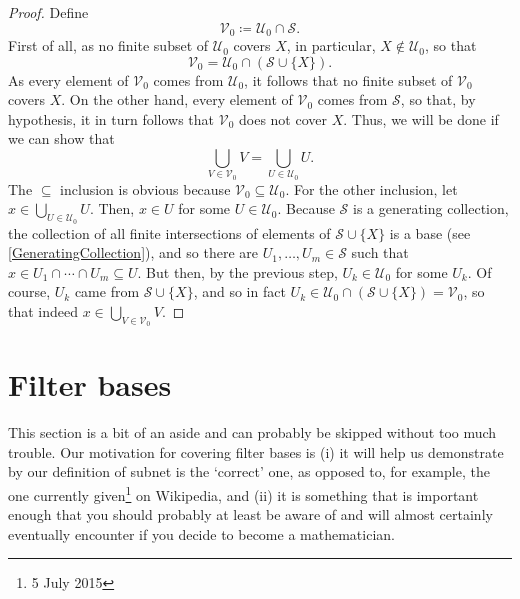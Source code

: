 \begin{thm}
\begin{proof}
Define
\begin{equation}
\mathcal{V}_0\coloneqq \mathcal{U}_0\cap \mathcal{S}.
\end{equation}
First of all, as no finite subset of $\mathcal{U}_0$ covers $X$, in particular, $X\notin \mathcal{U}_0$, so that
\begin{equation}
\mathcal{V}_0=\mathcal{U}_0\cap (\mathcal{S}\cup \{ X\} ).
\end{equation}
As every element of $\mathcal{V}_0$ comes from $\mathcal{U}_0$, it follows that no finite subset of $\mathcal{V}_0$ covers $X$.  On the other hand, every element of $\mathcal{V}_0$ comes from $\mathcal{S}$, so that, by hypothesis, it in turn follows that $\mathcal{V}_0$ does not cover $X$.  Thus, we will be done if we can show that
\begin{equation}
\bigcup _{V\in \mathcal{V}_0}V=\bigcup _{U\in \mathcal{U}_0}U.
\end{equation}
The $\subseteq$ inclusion is obvious because $\mathcal{V}_0\subseteq \mathcal{U}_0$.  For the other inclusion, let $x\in \bigcup _{U\in \mathcal{U}_0}U$.  Then, $x\in U$ for some $U\in \mathcal{U}_0$.  Because $\mathcal{S}$ is a generating collection, the collection of all finite intersections of elements of $\mathcal{S}\cup \{ X\}$ is a base (see \cref{GeneratingCollection}), and so there are $U_1,\ldots ,U_m\in \mathcal{S}$ such that $x\in U_1\cap \cdots \cap U_m\subseteq U$.  But then, by the previous step, $U_k\in \mathcal{U}_0$ for some $U_k$.  Of course, $U_k$ came from $\mathcal{S}\cup \{ X\}$, and so in fact $U_k\in \mathcal{U}_0\cap (\mathcal{S}\cup \{ X\} )=\mathcal{V}_0$, so that indeed $x\in \bigcup _{V\in \mathcal{V}_0}V$.
\end{proof}
\end{thm}

\section{Filter bases}\label{sct4.4}

This section is a bit of an aside and can probably be skipped without too much trouble.  Our motivation for covering filter bases is (i) it will help us demonstrate by our definition of subnet is the `correct' one, as opposed to, for example, the one currently given\footnote{5 July 2015} on Wikipedia, and (ii) it is something that is important enough that you should probably at least be aware of and will almost certainly eventually encounter if you decide to become a mathematician.


